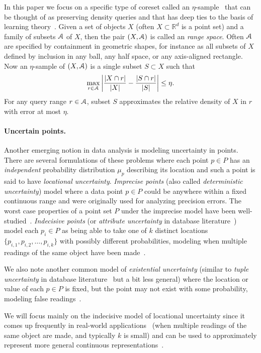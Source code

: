 \documentclass[11pt]{myclass}
\newcommand{\Eu}[1]{\ensuremath{\EuScript{#1}}}
\newcommand{\bl}[1]{\ensuremath{\mathbb{#1}}}
\newcommand{\Paragraph}[1]{\paragraph{\sffamily\textbf{#1.}}}
\begin{document}
In this paper we focus on a specific type of coreset called an $\eta$-sample~\cite{VC71,peled,CM96} that can be thought of as preserving density queries and that has deep ties to the basis of learning theory~\cite{AB99}.  Given a set of objects $X$ (often $X \subset \bl{R}^d$ is a point set) and a family of subsets $\Eu{A}$ of $X$, then the pair $(X,\Eu{A})$ is called an \emph{range space}.  Often $\Eu{A}$ are specified by containment in geometric shapes, for instance as all subsets of $X$ defined by inclusion in any ball, any half space, or any axis-aligned rectangle.  Now an $\eta$-sample of $(X,\Eu{A})$ is a single subset $S \subset X$ such that 
\[
\max_{r \in \Eu{A}} \left| \frac{|X \cap r|}{|X|} - \frac{|S \cap r|}{|S|} \right| \leq \eta.
\]
For any query range $r \in \Eu{A}$, subset $S$ approximates the relative density of $X$ in $r$ with error at most $\eta$.  

\Paragraph{Uncertain points}
Another emerging notion in data analysis is modeling uncertainty in points.  There are several formulations of these problems where each point $p \in P$ has an \emph{independent} probability distribution $\mu_p$ describing its location and such a point is said to have \emph{locational uncertainty}.  
\emph{Imprecise points} (also called \emph{deterministic uncertainty}) model where a data point $p \in P$ could be anywhere within a fixed continuous range and were originally used for analyzing precision errors. The worst case properties of a point set $P$ under the imprecise model have been
well-studied~\cite{gss-egbra-89,gss-cscah-93,bs-ads-04,hm-ticpps-08,ls-dtip-08,nt-teb-00,obj-ue-05,kl-lbbsd-10,k-bmips-08}.
\emph{Indecisive points}  (or \emph{attribute uncertainty} in database literature~\cite{1644250}) model each $p_i \in P$ as being able to take one of $k$ distinct locations $\{p_{i,1}, p_{i,2}, \ldots, p_{i,k}\}$ with possibly different probabilities, modeling when multiple readings of the same object have been made~\cite{JLP11,MDFW00,CLY09,CG09,ACTY09,ABSHNSW06}.  

We also note another common model of \emph{existential uncertainty} (similar to \emph{tuple uncertainty} in database literature~\cite{1644250} but a bit less general) where the location or value of each $p \in P$ is fixed, but the point may not exist with some probability, modeling false readings~\cite{KCS11a,KCS11b,1644250,CLY09}.


We will focus mainly on the indecisive model of locational uncertainty since it comes up frequently in real-world applications~\cite{MDFW00,ABSHNSW06} (when multiple readings of the same object are made, and typically $k$ is small) and can be used to approximately represent more general continuous representations~\cite{JLP12,Phi08}.  
\end{document}
